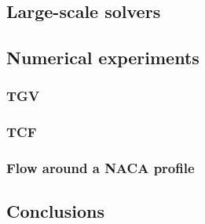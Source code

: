 \documentclass[compress,11 pt,t]{beamer}
\begin{document}
\subsection{Large-scale solvers}


\subsection{Numerical experiments}


\subsubsection{TGV}


\subsubsection{TCF}


\subsubsection{Flow around a NACA profile}


\subsection{Conclusions}

\end{document}
